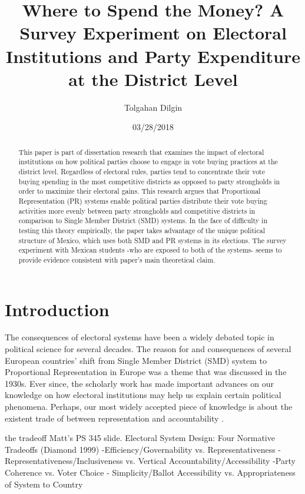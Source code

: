 \documentclass{article}
\begin{document}

	\title{Where to Spend the Money? A Survey Experiment on Electoral Institutions and Party Expenditure at the District Level}
	\author{Tolgahan Dilgin}
	\date{03/28/2018}
	\maketitle
	
\begin{abstract}
This paper is part of dissertation research that examines the impact of electoral institutions on how political parties choose to engage in vote buying practices at the district level. Regardless of electoral rules, parties tend to concentrate their vote buying spending in the most competitive districts as opposed to party strongholds in order to maximize their electoral gains. This research argues that Proportional Representation (PR) systems enable political parties distribute their vote buying activities more evenly between party strongholds and competitive districts in comparison to Single Member District (SMD) systems. In the face of difficulty in testing this theory empirically, the paper takes advantage of the unique political structure of Mexico, which uses both SMD and PR systems in its elections. The survey experiment with Mexican students -who are exposed to both of the systems- seems to provide evidence consistent with paper's main theoretical claim.
\end{abstract}

\section{Introduction}
The consequences of electoral systems have been a widely debated topic in political science for several decades. The reason for and consequences of several European countries' shift from Single Member District (SMD) system to Proportional Representation in Europe was a theme that was discussed in the 1930s. Ever since, the scholarly work has made important advances on our knowledge on how electoral institutions may help us explain certain political phenomena. Perhaps, our most widely accepted piece of knowledge is about the existent trade of between representation and accountability \cite{diamond1999developing}.

\iffalse the tradeoff
Matt's PS 345 slide. 
Electoral System Design: Four Normative Tradeoffs (Diamond 1999)
-Efficiency/Governability vs. Representativeness
-Representativeness/Inclusiveness vs. Vertical Accountability/Accessibility 
-Party Coherence vs. Voter Choice
- Simplicity/Ballot Accessibility vs. Appropriateness of System to Country
\end{document}
